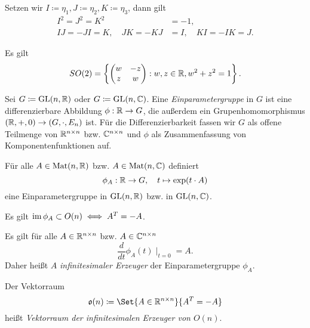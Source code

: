 \documentclass{cheat-sheet}
\DeclareMathOperator{\GL}{GL}
\DeclareMathOperator{\Mat}{Mat}
\begin{document}
\begin{defn}
  Setzen wir $I \coloneqq \eta_1, J \coloneqq \eta_2, K \coloneqq \eta_3$, dann gilt
  \begin{align*}
  I^2 = J^2 = K^2 &= -1, \\
  IJ = -JI = K, \quad JK = -KJ &= I, \quad KI = -IK = J.
  \end{align*}
\end{defn}

\begin{satz}
  Es gilt
  \[ SO(2) = \left\{ \begin{pmatrix} w & -z \\ z & w \end{pmatrix} : w, z \in \mathbb{R}, w^2 + z^2 = 1 \right\}. \]
\end{satz}


\begin{defn}
  Sei $G \coloneqq \GL(n, \R)$ oder $G \coloneqq \GL(n, \C)$. Eine \emph{Einparametergruppe} in $G$ ist eine differenzierbare Abbildung $\phi : \mathbb{R} \to G$, die außerdem ein Grupenhomomorphismus $(\mathbb{R}, +, 0) \to (G, \cdot, E_n)$ ist. Für die Differenzierbarkeit fassen wir $G$ als offene Teilmenge von $\mathbb{R}^{n \times n}$ bzw. $\mathbb{C}^{n \times n}$ und $\phi$ als Zusammenfassung von Komponentenfunktionen auf.
\end{defn}

\begin{satz}
  Für alle $A \in \Mat(n, \R)$ bzw. $A \in \Mat(n, \C)$ definiert
  \[ \phi_A : \mathbb{R} \to G, \quad t \mapsto \exp(t \cdot A) \]
  eine Einparametergruppe in $\GL(n, \R)$ bzw. in $\GL(n, \C)$.
\end{satz}

\begin{satz}
  Es gilt $\mathop{\mathrm{im}} \phi_A \subset O(n) \iff A^T = -A$.
\end{satz}

\begin{bem}
  Es gilt für alle $A \in \mathbb{R}^{n \times n}$ bzw. $A \in \mathbb{C}^{n \times n}$
  \[ \frac{d}{dt} \phi_A(t) \mid_{t=0} = A. \]
  Daher heißt $A$ \emph{infinitesimaler Erzeuger} der Einparametergruppe $\phi_A$.
\end{bem}

\begin{defn}
  Der Vektorraum
  \[ \mathfrak{o}(n) \coloneqq \Set{ A \in \R^{n \times n} }{ A^T = - A } \]
  heißt \emph{Vektorraum der infinitesimalen Erzeuger von $O(n)$}.
\end{defn}
\end{document}
